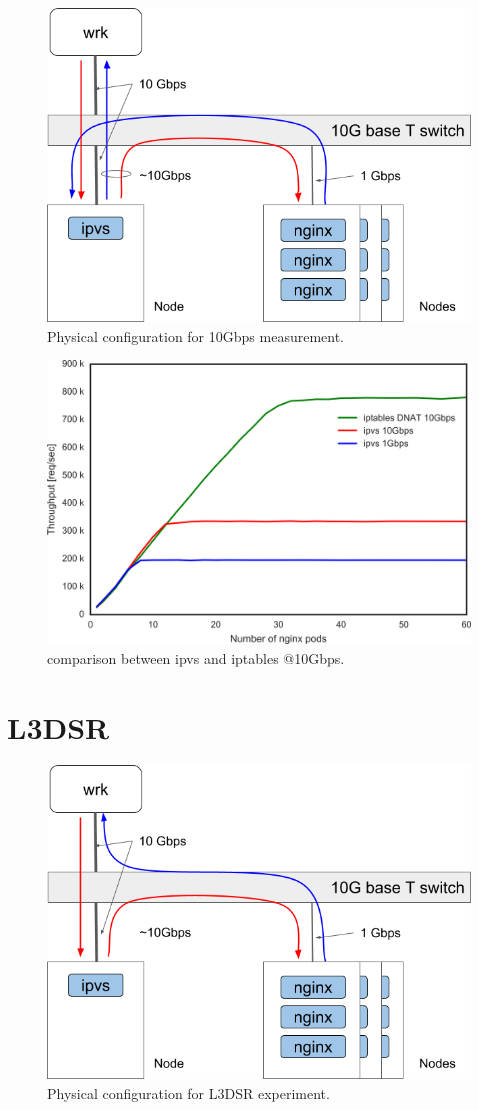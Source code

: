\begin{figure}[t]
  \centering
  \includegraphics[width=0.8\columnwidth]{Figs/bench_10g}
  \caption{Physical configuration for 10Gbps measurement.}
  \label{fig:bench_10g}
\end{figure}

\begin{figure}[t]
  \centering
  \includegraphics[width=0.8\columnwidth]{Figs/ipvs_iptables_dnat_10g}
  \caption{comparison between ipvs and iptables @10Gbps.}
  \label{fig:ipvs_iptables_dnat_10g}
\end{figure}

\section{L3DSR}

\begin{figure}[t]
  \centering
  \includegraphics[width=0.8\columnwidth]{Figs/bench_10g_l3dsr}
  \caption{Physical configuration for L3DSR experiment.}
  \label{fig:bench_10g_l3dsr}
\end{figure}

